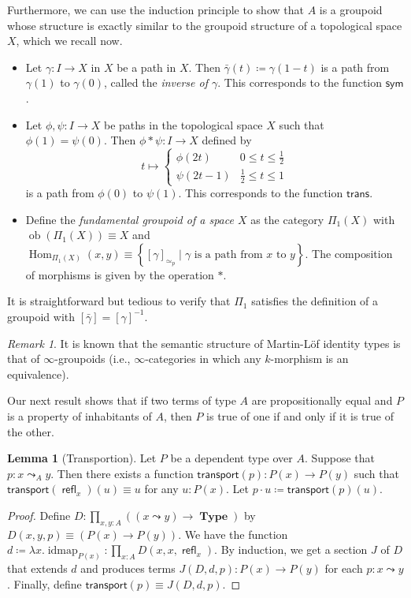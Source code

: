 \documentclass[10pt,letterpaper,cm]{nupset}
\theoremstyle{definition}
\theoremstyle{theorem}
\newtheorem{lemma}[definition]{Lemma}
\theoremstyle{remark}
\newtheorem{remark}[definition]{Remark}
\newcommand{\1}{\mathbf{1}}
\newcommand{\0}{\vec 0}
\DeclareMathOperator{\idmap}{idmap}
\DeclareMathOperator{\ob}{ob}
\DeclareMathOperator{\refl}{\mathsf{refl}}
\DeclareMathOperator{\Hom}{Hom}
\DeclareMathOperator{\type}{\mathbf{Type}}
\begin{document}
Furthermore, we can use the induction principle to show that $A$ is a groupoid whose structure is exactly similar to the groupoid structure of a topological space $X$, which we recall now.
\begin{itemize}
\item Let $\gamma : I \to X$ in $X$ be a path in $X$. Then $\bar{\gamma}(t)\coloneqq \gamma(1-t)$ is a path from $\gamma(1)$ to $\gamma(0)$, called the \textit{inverse of $\gamma$}. This corresponds to the function $\mathsf{sym}$. 
\item Let $\phi, \psi: I \to X$ be paths in the topological space $X$ such that $\phi(1) = \psi(0)$. Then $\phi \ast \psi : I \to X$ defined by  $$t\mapsto  \begin{cases} \phi(2t) & 0\leq t \leq \frac{1}{2} \\ \psi(2t-1) & \frac{1}{2} \leq t \leq 1 \end{cases}$$ is a path from $\phi(0)$ to $\psi(1)$. This corresponds to the function $\mathsf{trans}$.
\item Define the \textit{fundamental groupoid of a space $X$} as the category $\Pi_1(X)$ with $\ob(\Pi_1(X)) \equiv X$ and $\Hom_{\Pi_1(X)}(x,y) \equiv \left\{[\gamma]_{\simeq_p} \mid \gamma \text{ is a path from }x \text{ to }y\right\}$. The composition of morphisms is given by the operation $\ast$. 
\end{itemize}
It is straightforward but tedious to verify that $\Pi_1$ satisfies the definition of a groupoid with $\left[\bar{\gamma}\right] = \left[\gamma\right]^{{-}1}$.

\smallskip

\begin{remark}
 It is known that the semantic structure of Martin-L\"of identity types is that of $\infty$-groupoids (i.e., $\infty$-categories in which any $k$-morphism is an equivalence).
\end{remark}

\medskip

Our next result shows that if two terms of type $A$ are propositionally equal and $P$ is a property of inhabitants of $A$, then $P$ is true of one if and only if it is true of the other.

\begin{lemma}[Transportion]
Let $P$ be a dependent type over $A$. Suppose that $p: x\leadsto_A y$. Then there exists a function $\mathsf{transport}(p) : P(x) \to P(y)$ such that $\mathsf{transport}(\refl_x)(u) \equiv u$ for any $u: P(x)$. Let $p \cdot u \coloneqq \mathsf{transport}(p)(u)$.
\end{lemma}
\begin{proof}
Define $D: \prod_{x,y:A}\left(\left(x\leadsto y\right) \to \type\right)$ by  $D(x,y,p) \equiv \left(P(x) \to P(y)\right)$. We have the function $d\coloneqq \lambda x.\idmap_{P(x)} :\prod_{x:A}D(x,x,\refl_x)$. By induction, we get a section $J$ of $D$ that extends $d$ and produces terms $J(D,d,p) :P(x) \to P(y)$ for each $p: x\leadsto y$. Finally, define $\mathsf{transport}(p) \equiv J(D,d,p)$.
\end{proof}
\end{document}
